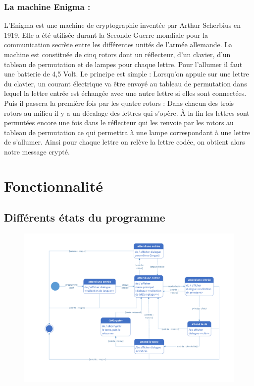 \documentclass[a4paper,12pt,abstracton,titlepage]{scrartcl}
\begin{document}
\subsubsection{La machine Enigma :}
L’Enigma est une machine de cryptographie inventée par Arthur Scherbius en 1919. Elle a été utilisée durant la Seconde Guerre mondiale pour la communication secrète entre les différentes unités de l’armée allemande.
La machine est constituée de cinq rotors dont un réflecteur, d’un clavier, d’un tableau de permutation et de lampes pour chaque lettre. Pour l’allumer il faut une batterie de 4,5 Volt.
Le principe est simple : Lorsqu’on appuie sur une lettre du clavier, un courant électrique va être envoyé au tableau de permutation dans lequel la lettre entrée est échangée avec une autre lettre si elles sont connectées. Puis il passera la première fois par les quatre rotors : Dans chacun des trois rotors au milieu il y a un décalage des lettres qui s’opère. À la fin les lettres sont permutées encore une fois dans le réflecteur qui les renvoie par les rotors au tableau de permutation ce qui permettra à une lampe correspondant à une lettre de s’allumer. Ainsi pour chaque lettre on relève la lettre codée, on obtient alors notre message crypté.

\section{Fonctionnalité}
\subsection{Différents états du programme}
\begin{figure}[tpbh]
	\centering
  \includegraphics[width=\textwidth, trim=25mm 10mm 10mm 8mm, clip]{./Diagrammes/diagrammeDesEtats.pdf}
	\label{img:etats}
\end{figure}
\end{document}
